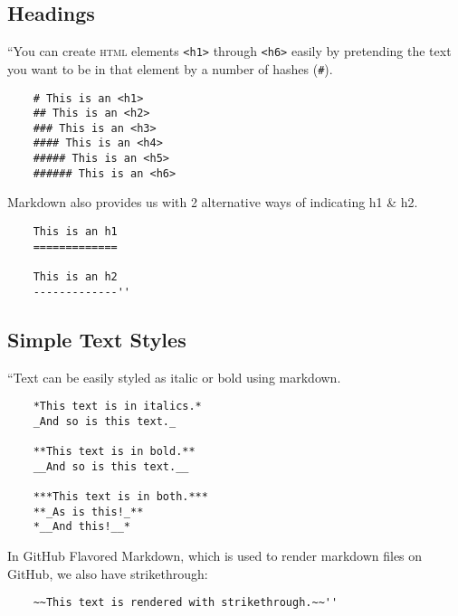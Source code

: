 \documentclass[oneside]{book}
\numberwithin{equation}{section}
\begin{document}
\subsection{Headings}
``You can create \textsc{html} elements \texttt{<h1>} through \texttt{<h6>} easily by pretending the text you want to be in that element by a number of hashes (\verb|#|).
\begin{verbatim}
	# This is an <h1>
	## This is an <h2>
	### This is an <h3>
	#### This is an <h4>
	##### This is an <h5>
	###### This is an <h6>
\end{verbatim}
Markdown also provides us with 2 alternative ways of indicating h1 \& h2.
\begin{verbatim}
	This is an h1
	=============
	
	This is an h2
	-------------''
\end{verbatim}

\subsection{Simple Text Styles}
``Text can be easily styled as italic or bold using markdown.
\begin{verbatim}
	*This text is in italics.*
	_And so is this text._
	
	**This text is in bold.**
	__And so is this text.__
	
	***This text is in both.***
	**_As is this!_**
	*__And this!__*
\end{verbatim}
In GitHub Flavored Markdown, which is used to render markdown files on GitHub, we also have strikethrough:
\begin{verbatim}
	~~This text is rendered with strikethrough.~~''
\end{verbatim}
\end{document}
